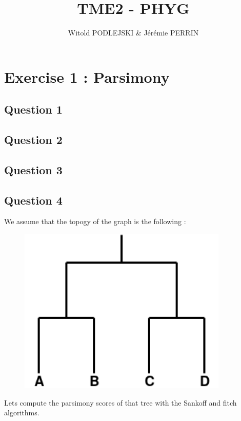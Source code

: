 \documentclass[]{article}
\title{TME2 - PHYG}
\author{Witold PODLEJSKI \& Jérémie PERRIN}
\begin{document}
\maketitle

\section{Exercise 1 : Parsimony}
\subsection{Question 1}
\subsection{Question 2}
\subsection{Question 3}
\subsection{Question 4}
We assume that the topogy of the graph is the following :

\begin{figure}[h!]
	\includegraphics*[width = 10cm]{image/topology.png}
\end{figure}

Lets compute the parsimony scores of that tree with the Sankoff and fitch algorithms.
\end{document}
